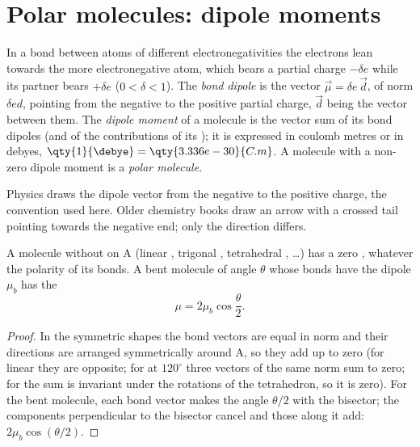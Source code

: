\section{Polar molecules: dipole moments}

\begin{definition}\label{def:b1:lewis-resonance-vsepr:dipole}
In a bond between atoms of different electronegativities the electrons
lean towards the more electronegative atom, which bears a partial charge
$-\delta e$ while its partner bears $+\delta e$ ($0 < \delta < 1$). The
\emph{bond dipole} is the vector $\vec\mu = \delta e\,
\vec d$, of norm $\delta e d$, pointing from the negative to the positive
partial charge, $\vec d$ being the vector between them. The
\emph{dipole moment} of a molecule is the vector sum
of its bond dipoles (and of the contributions of its ); it is
expressed in coulomb metres or in debyes, $\qty{1}{\debye} =
\qty{3.336e-30}{C.m}$. A molecule with a non-zero dipole moment is a
\emph{polar molecule}.
\end{definition}

\begin{remark}\label{rem:b1:lewis-resonance-vsepr:convention}
Physics draws the dipole vector from the negative to the positive
charge, the convention used here. Older chemistry books draw an arrow
with a crossed tail pointing towards the negative end; only the
direction differs.
\end{remark}

\begin{proposition}\label{prop:b1:lewis-resonance-vsepr:dipole-sum}
A molecule  without  on A (linear , trigonal
, tetrahedral , \dots) has a zero , whatever
the polarity of its bonds. A bent  molecule of angle $\theta$
whose bonds have the dipole $\mu_b$ has the 
\[
  \mu = 2\mu_b \cos\frac{\theta}{2} .
\]
\end{proposition}

\begin{proof}
In the symmetric shapes the bond vectors are equal in norm and their
directions are arranged symmetrically around A, so they add up to zero
(for  linear they are opposite; for  at $120^\circ$
three vectors of the same norm sum to zero; for  the sum is
invariant under the rotations of the tetrahedron, so it is zero). For the
bent molecule, each bond vector makes the angle $\theta/2$ with the
bisector; the components perpendicular to the bisector cancel and those
along it add: $2\mu_b\cos(\theta/2)$.
\end{proof}

